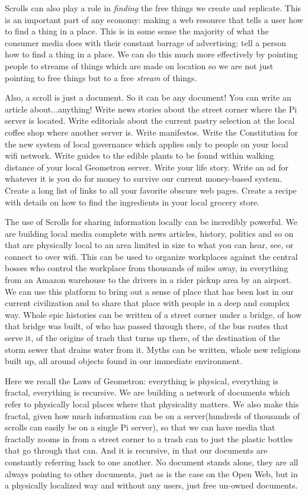 Scrolls can also play a role in \emph{finding} the free things we create and replicate.  This is an important part of any economy: making a web resource that tells a user how to find a thing in a place.  This is in some sense the majority of what the consumer media does with their constant barrage of advertising: tell a person how to find a thing in a place.  We can do this much more effectively by pointing people to streams of things which are made on location so we are not just pointing to free things but to a free \emph{stream} of things.

Also, a scroll is just a document. So it can be any document! You can write an article about...anything! Write news stories about the street corner where the Pi server is located.  Write editorials about the current pastry selection at the local coffee shop where another server is.  Write manifestos. Write the Constitution for the new system of local governance which applies only to people on your local wifi network.  Write guides to the edible plants to be found within walking distance of your local Geometron server.  Write your life story.  Write an ad for whatever it is you do for money to survive our current money-based system.  Create a long list of links to all your favorite obscure web pages.  Create a recipe with details on how to find the ingredients in your local grocery store.  

The use of Scrolls for sharing information locally can be incredibly powerful.  We are building local media complete with news articles, history, politics and so on that are physically local to an area limited in size to what you can hear, see, or connect to over wifi.  This can be used to organize workplaces against the central bosses who control the workplace from thousands of miles away, in everything from an Amazon warehouse to the drivers in a rider pickup area by an airport.  We can use this platform to bring out a sense of place that has been lost in our current civilization and to share that place with people in a deep and complex way.  Whole epic histories can be written of a street corner under a bridge, of how that bridge was built, of who has passed through there, of the bus routes that serve it, of the origins of trash that turns up there, of the destination of the storm sewer that drains water from it.  Myths can be written, whole new religions built up, all around objects found in our immediate environment.  

Here we recall the Laws of Geometron: everything is physical, everything is fractal, everything is recursive.  We are building a network of documents which refer to physically local places where that physicality matters.  We also make this fractal, given how much information can be on a server(hundreds of thousands of scrolls can easily be on a single Pi server), so that we can have media that fractally zooms in from a street corner to a trash can to just the plastic bottles that go through that can.  And it is recursive, in that our documents are constantly referring back to one another.  No document stands alone, they are all always pointing to other documents, just as is the case on the Open Web, but in a physically localized way and without any users, just free un-owned documents.

